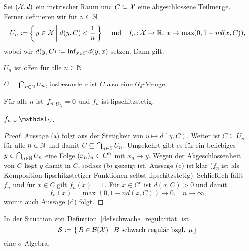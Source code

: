 \documentclass[../thesis/thesis.tex]{subfiles}
\begin{document}
	\begin{Hilfssatz}
		\label{hilfssatz:offene_mengen}
		Sei $(\mathcal{X}, d)$ ein metrischer Raum und $C \subseteq \mathcal{X}$ eine abgeschlossene 
		Teilmenge. Ferner definieren wir für $n \in \mathbb{N}$
		$$ U_n \vcentcolon = \left\{\, y \in \mathcal{X} \; \middle| \; d(y, C) < \frac{1}{n} \,\right\} \quad \text{und} \quad 
		f_n \colon \mathcal{X} \to \mathbb{R}, \; x \mapsto \max (0, 1-n d(x, C))  \text{,}$$
		wobei wir $d(y, C) \vcentcolon = \inf_{x \in C} d(y, x)$ setzen.
		Dann gilt:
		\begin{enumeratethm}
			\item $U_n$ ist offen für alle $n \in \mathbb{N}$.
			\item $C = \bigcap_{n \in \mathbb{N}} U_n$, insbesondere ist $C$ also eine $G_\delta$-Menge.
			\item Für alle $n$ ist $\left.f_n\right|_{U_n^\mathsf{c}} = 0$ und $f_n$ ist lipschitzstetig.
			\item $f_n \convdown \indfct_C$.
		\end{enumeratethm}
	\end{Hilfssatz}
	
	\begin{proof}
		Aussage (a) folgt aus der Stetigkeit von $y \mapsto d(y, C)$.
		Weiter ist $C \subseteq U_n$ für alle $n \in \mathbb{N}$ und damit 
		$C \subseteq \bigcap_{n \in \mathbb{N}} U_n$. 
		Umgekehrt gibt es für ein beliebiges $y \in \bigcap_{n \in \mathbb{N}} U_n$
		eine Folge $(x_n)_n \in C^{\mathbb{N}}$ mit $x_n \rightarrow y$. 
		Wegen der Abgeschlossenheit von $C$ liegt $y$ damit in $C$, sodass (b) gezeigt ist.
		Aussage (c) ist klar ($f_n$ ist als Komposition 
		lipschitzstetiger Funktionen selbst lipschitzstetig).
		Schließlich fällt $f_n$ und für $x \in C$ gilt $f_n(x) = 1$. 
		Für $x \in C^\mathsf{c}$ ist $d(x, C) > 0$ und damit
		$$f_n(x) = \max (0, 1-n d(x, C))
		\to 0 \text{,} \quad n \to \infty \text{,}$$
		womit auch Aussage (d) folgt.
	\end{proof}
	
	\begin{Hilfssatz}
		\label{hilfssatz:schwach_reguläre_mengen_sigma_algebra}
		In der Situation von Definition~\ref{def:schwache_regularität} ist
		$$\mathcal{S} \vcentcolon = \left\{\, B \in \mathcal{B}(\mathcal{X}) \; \middle| \; B \text{ schwach regulär bzgl. } \mu \,\right\}$$
		eine $\sigma$-Algebra.
	\end{Hilfssatz}
	
\end{document}
